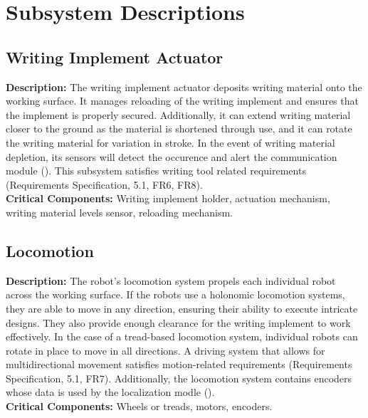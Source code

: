 
\section{Subsystem Descriptions}
\label{sec:subsystem_descriptions}

\subsection{Writing Implement Actuator}
\label{sec:subsystem_writing_implement_actuator}
\textbf{Description:} The writing implement actuator deposits writing material onto the working surface. It manages reloading of the writing implement and ensures that the implement is properly secured. Additionally, it can extend writing material closer to the ground as the material is shortened through use, and it can rotate the writing material for variation in stroke. In the event of writing material depletion, its sensors will detect the occurence and alert the communication module (). This subsystem satisfies writing tool related requirements (Requirements Specification, 5.1, FR6, FR8).\\
\textbf{Critical Components:} Writing implement holder, actuation mechanism, writing material levels sensor, reloading mechanism.\\

\subsection{Locomotion}
\label{sec:subsystem_locomotion}
\textbf{Description:} The robot's locomotion system propels each individual robot across the working surface. If the robots use a holonomic locomotion systems, they are able to move in any direction, ensuring their ability to execute intricate designs. They also provide enough clearance for the writing implement to work effectively. In the case of a tread-based locomotion system, individual robots can rotate in place to move in all directions. A driving system that allows for multidirectional movement satisfies motion-related requirements (Requirements Specification, 5.1, FR7). Additionally, the locomotion system contains encoders whose data is used by the localization modle ().\\
\textbf{Critical Components:} Wheels or treads, motors, encoders.\\

